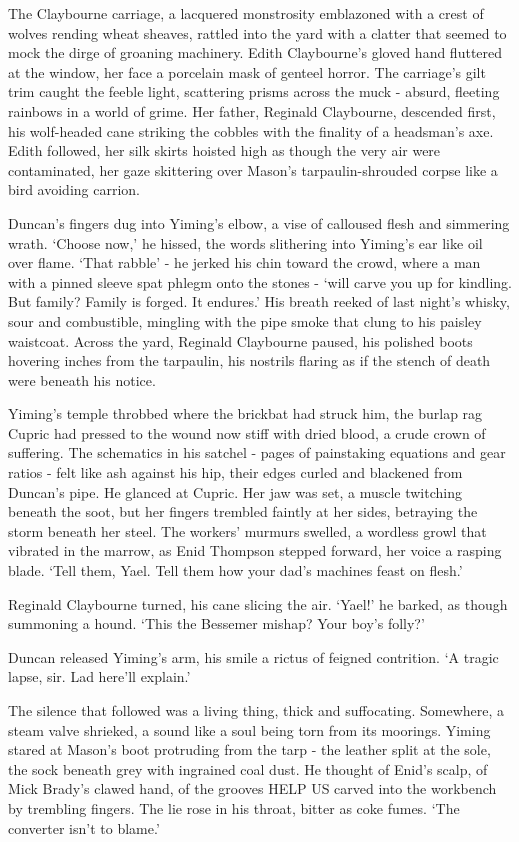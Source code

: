 The Claybourne carriage, a lacquered monstrosity emblazoned with a crest of wolves rending wheat sheaves, rattled into the yard with a clatter that seemed to mock the dirge of groaning machinery. Edith Claybourne's gloved hand fluttered at the window, her face a porcelain mask of genteel horror. The carriage's gilt trim caught the feeble light, scattering prisms across the muck - absurd, fleeting rainbows in a world of grime. Her father, Reginald Claybourne, descended first, his wolf-headed cane striking the cobbles with the finality of a headsman's axe. Edith followed, her silk skirts hoisted high as though the very air were contaminated, her gaze skittering over Mason's tarpaulin-shrouded corpse like a bird avoiding carrion.

Duncan's fingers dug into Yiming's elbow, a vise of calloused flesh and simmering wrath. `Choose now,' he hissed, the words slithering into Yiming's ear like oil over flame. `That rabble' - he jerked his chin toward the crowd, where a man with a pinned sleeve spat phlegm onto the stones - `will carve you up for kindling. But family? Family is forged. It endures.' His breath reeked of last night's whisky, sour and combustible, mingling with the pipe smoke that clung to his paisley waistcoat. Across the yard, Reginald Claybourne paused, his polished boots hovering inches from the tarpaulin, his nostrils flaring as if the stench of death were beneath his notice.

Yiming's temple throbbed where the brickbat had struck him, the burlap rag Cupric had pressed to the wound now stiff with dried blood, a crude crown of suffering. The schematics in his satchel - pages of painstaking equations and gear ratios - felt like ash against his hip, their edges curled and blackened from Duncan's pipe. He glanced at Cupric. Her jaw was set, a muscle twitching beneath the soot, but her fingers trembled faintly at her sides, betraying the storm beneath her steel. The workers' murmurs swelled, a wordless growl that vibrated in the marrow, as Enid Thompson stepped forward, her voice a rasping blade. `Tell them, Yael. Tell them how your dad's machines feast on flesh.'

Reginald Claybourne turned, his cane slicing the air. `Yael!' he barked, as though summoning a hound. `This the Bessemer mishap? Your boy's folly?'

Duncan released Yiming's arm, his smile a rictus of feigned contrition. `A tragic lapse, sir. Lad here'll explain.'

The silence that followed was a living thing, thick and suffocating. Somewhere, a steam valve shrieked, a sound like a soul being torn from its moorings. Yiming stared at Mason's boot protruding from the tarp - the leather split at the sole, the sock beneath grey with ingrained coal dust. He thought of Enid's scalp, of Mick Brady's clawed hand, of the grooves HELP US carved into the workbench by trembling fingers. The lie rose in his throat, bitter as coke fumes. `The converter isn't to blame.'

